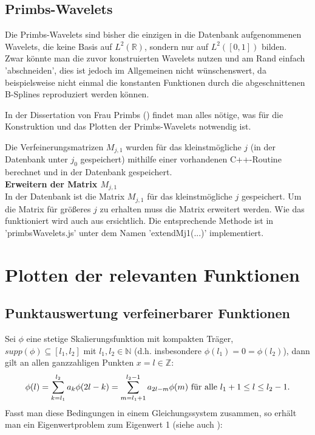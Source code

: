\documentclass[11pt,a4paper,titlepage]{article}
\theoremstyle{plain} %
\theoremstyle{definition} %
\numberwithin{equation}{section} %
\begin{document}
		
		\subsection{Primbs-Wavelets}
		Die Primbs-Wavelets sind bisher die einzigen in die Datenbank aufgenommenen Wavelets, die keine Basis auf $L^2(\mathbb{R})$, sondern nur auf $L^2([0,1])$ bilden.\\ Zwar könnte man die zuvor konstruierten Wavelets nutzen und am Rand einfach 'abschneiden', dies ist jedoch im Allgemeinen nicht wünschenswert, da beispielsweise nicht einmal die konstanten Funktionen durch die abgeschnittenen B-Splines reproduziert werden können.
		
		In der Dissertation von Frau Primbs (\cite{Primbs2006}) findet man alles nötige, was für die Konstruktion und das Plotten der Primbs-Wavelets notwendig ist.
		
		Die Verfeinerungsmatrizen $M_{j,1}$ wurden für das kleinstmögliche $j$ (in der Datenbank unter $j_0$ gespeichert) mithilfe einer vorhandenen C++-Routine \cite{RaaWer} berechnet und in der Datenbank gespeichert.\\
	
	\textbf{Erweitern der Matrix $M_{j,1}$}\\
	In der Datenbank ist die Matrix $M_{j,1}$ für das kleinstmögliche $j$ gespeichert. Um die Matrix für größeres $j$ zu erhalten muss die Matrix erweitert werden. Wie das funktioniert wird auch aus \cite{Primbs2006} ersichtlich. Die entsprechende Methode ist in 'primbsWavelets.js' unter dem Namen 'extendMj1(...)' implementiert. 
	
		
	
	\section{Plotten der relevanten Funktionen}
	\subsection{Punktauswertung verfeinerbarer Funktionen}
	\label{subsec:Punktauswertung}
	Sei $\phi$ eine stetige Skalierungsfunktion mit kompakten Träger, $supp(\phi) \subseteq [l_1,l_2]$ mit $l_1, l_2 \in \mathbb{N}$ (d.h. insbesondere $\phi(l_1)=0=\phi(l_2)$), dann gilt an allen ganzzahligen Punkten $x=l \in \mathbb{Z}$:
	\begin{equation}
		\phi(l)=\sum_{k=l_1}^{l_2}a_k \phi(2l-k)=\sum_{m=l_1+1}^{l_2-1}a_{2l-m}\phi(m) \text{ für alle } l_1+1\leq l \leq l_2-1.\\
	\end{equation}
	Fasst man diese Bedingungen in einem Gleichungssystem zusammen, so erhält man ein Eigenwertproblem zum Eigenwert 1 (siehe auch \cite{TR}):
	
\end{document}
